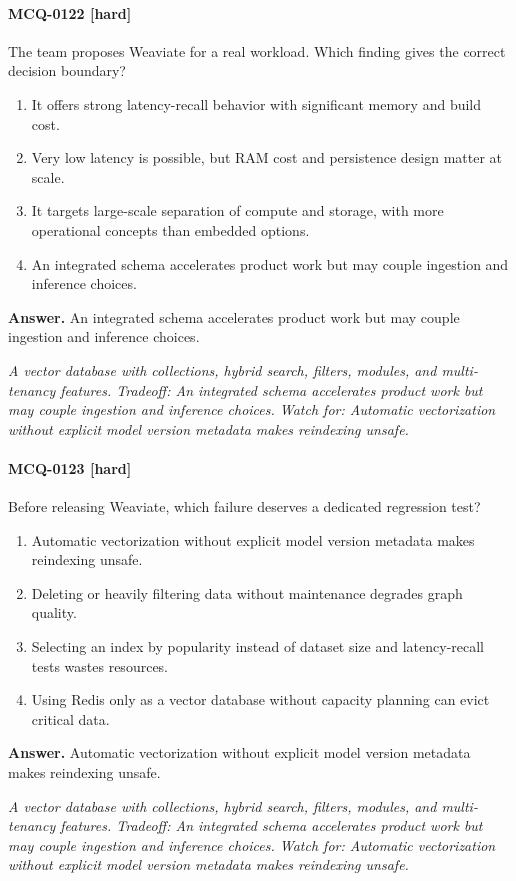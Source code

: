 \paragraph{MCQ-0122 [hard]} The team proposes Weaviate for a real workload. Which finding gives the correct decision boundary?
\begin{enumerate}[label=\Alph*.]
\item It offers strong latency-recall behavior with significant memory and build cost.
\item Very low latency is possible, but RAM cost and persistence design matter at scale.
\item It targets large-scale separation of compute and storage, with more operational concepts than embedded options.
\item An integrated schema accelerates product work but may couple ingestion and inference choices.
\end{enumerate}
\noindent\textbf{Answer.} An integrated schema accelerates product work but may couple ingestion and inference choices.
\par\textit{A vector database with collections, hybrid search, filters, modules, and multi-tenancy features. Tradeoff: An integrated schema accelerates product work but may couple ingestion and inference choices. Watch for: Automatic vectorization without explicit model version metadata makes reindexing unsafe.}
\paragraph{MCQ-0123 [hard]} Before releasing Weaviate, which failure deserves a dedicated regression test?
\begin{enumerate}[label=\Alph*.]
\item Automatic vectorization without explicit model version metadata makes reindexing unsafe.
\item Deleting or heavily filtering data without maintenance degrades graph quality.
\item Selecting an index by popularity instead of dataset size and latency-recall tests wastes resources.
\item Using Redis only as a vector database without capacity planning can evict critical data.
\end{enumerate}
\noindent\textbf{Answer.} Automatic vectorization without explicit model version metadata makes reindexing unsafe.
\par\textit{A vector database with collections, hybrid search, filters, modules, and multi-tenancy features. Tradeoff: An integrated schema accelerates product work but may couple ingestion and inference choices. Watch for: Automatic vectorization without explicit model version metadata makes reindexing unsafe.}
